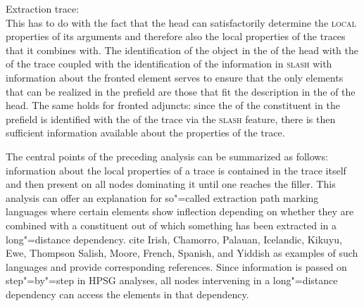 \eas
\label{le-extraktionsspur}
Extraction trace: \\
\zs
This has to do with the fact that the head can satisfactorily determine the \textsc{local} properties of its arguments and therefore also the
local properties of the traces that it combines with. The identification of the object in the \subcatl of the head with the \synsemv of the trace 
coupled with the identification of the information in \textsc{slash} with information about the fronted element serves to ensure that the only elements
that can be realized in the prefield are those that fit the description in the \subcatl of the head. The same holds for fronted adjuncts: since the \localv of the constituent 
in the prefield is identified with the \localv of the trace via the \textsc{slash} feature, there is then sufficient information available about the properties
of the trace.

The central points of the preceding analysis can be summarized as follows: information about the local properties of a trace is contained in the trace
itself and then present on all nodes dominating it until one reaches the filler. This analysis can
offer an explanation for so"=called extraction path marking languages where 
certain elements show inflection depending on whether they are combined with a constituent out of which something has been extracted in a long"=distance dependency.
\citet*{BMS2001a} cite\label{Seite-Irishe-Komplementierer}  Irish,
Chamorro, Palauan, Icelandic, Kikuyu,
Ewe, Thompson Salish, Moore, French, Spanish, and Yiddish as examples of such languages and provide corresponding references.
Since information is passed on step"=by"=step in HPSG analyses, all nodes intervening in a long"=distance dependency can access the elements
in that dependency.%

